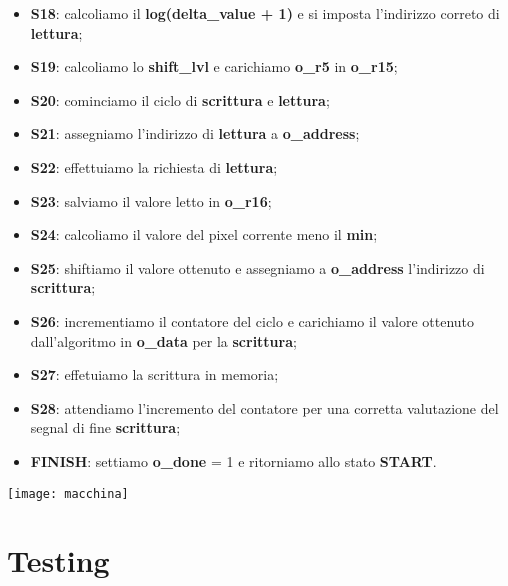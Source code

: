 \documentclass[a4paper, 12pt]{report}
\begin{document}
\begin{itemize}
				\item \textbf{S18}: calcoliamo il \textbf{log(delta\_value + 1)} e si imposta l'indirizzo correto di \textbf{lettura};
				\item \textbf{S19}: calcoliamo lo \textbf{shift\_lvl} e carichiamo \textbf{o\_r5} in \textbf{o\_r15}; 
				\item \textbf{S20}: cominciamo il ciclo di \textbf{scrittura} e \textbf{lettura};
				\item \textbf{S21}: assegniamo l'indirizzo di \textbf{lettura} a \textbf{o\_address};
				\item \textbf{S22}: effettuiamo la richiesta di \textbf{lettura};
				\item \textbf{S23}: salviamo il valore letto in \textbf{o\_r16};
				\item \textbf{S24}: calcoliamo il valore del pixel corrente meno il \textbf{min};
				\item \textbf{S25}:	shiftiamo il valore ottenuto e assegniamo a \textbf{o\_address} l'indirizzo di \textbf{scrittura};
				\item \textbf{S26}: incrementiamo il contatore del ciclo e carichiamo il valore ottenuto dall'algoritmo in \textbf{o\_data} per la \textbf{scrittura};
				\item \textbf{S27}: effetuiamo la scrittura in memoria;
				\item \textbf{S28}: attendiamo l'incremento del contatore per una corretta valutazione del segnal di fine \textbf{scrittura};
				\item \textbf{FINISH}: settiamo \textbf{o\_done} = 1 e ritorniamo allo stato \textbf{START}.
			\end{itemize}
			\begin{center}
				\texttt{[image: macchina]}
			\end{center}
	\chapter{Testing}
\end{document}
